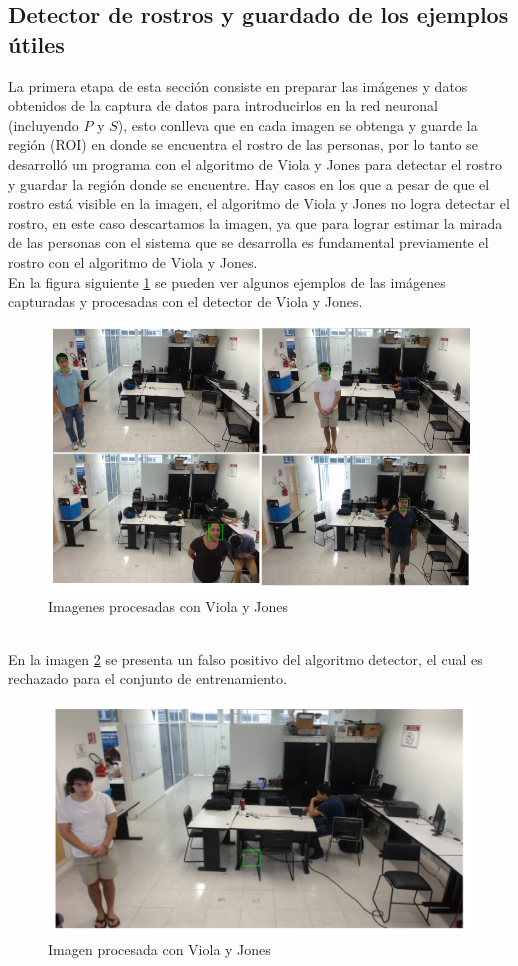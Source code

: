 \subsection{Detector de rostros y guardado de los ejemplos útiles}
La primera etapa de esta sección consiste en preparar las imágenes y datos obtenidos de la captura de datos para introducirlos en la red neuronal (incluyendo $P$ y $S$), esto conlleva que en cada imagen se obtenga y guarde la región (ROI) en donde se encuentra el rostro de las personas, por lo tanto se desarrolló un programa con el algoritmo de Viola y Jones para detectar el rostro y guardar la región donde se encuentre. Hay casos en los que a pesar de que el rostro está visible en la imagen, el algoritmo de Viola y Jones no logra detectar el rostro, en este caso descartamos la imagen, ya que para lograr estimar la mirada de las personas con el sistema que se desarrolla es fundamental previamente el rostro con el algoritmo de Viola y Jones.\\
En la figura siguiente \ref{fig: figViola} se pueden ver algunos ejemplos de las imágenes capturadas y procesadas con el detector de Viola y Jones.
\begin{figure}[htbp] 
	\centering
	\includegraphics[width=.7\textwidth]{./pictures/violaJones}
	\caption{Imagenes procesadas con Viola y Jones}\label{fig: figViola}
\end{figure}
\\En la imagen  \ref{fig: figNoViola} se presenta un falso positivo del algoritmo detector, el cual es rechazado para el conjunto de entrenamiento.
\begin{figure}[htbp] 
	\centering
	\includegraphics[width=.7\textwidth]{./pictures/noViola}
	\caption{Imagen procesada con Viola y Jones}\label{fig: figNoViola}
\end{figure}
